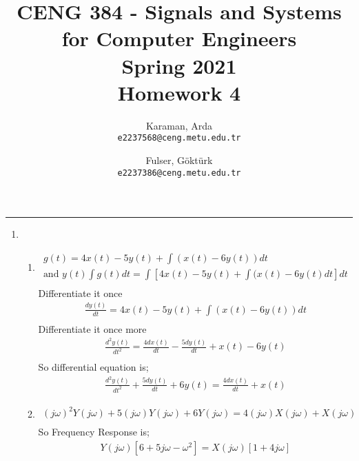 \documentclass[10pt,a4paper, margin=1in]{article}
\author{
  Karaman, Arda\\
  \texttt{e2237568@ceng.metu.edu.tr}
  \and
  Fulser, Göktürk\\
  \texttt{e2237386@ceng.metu.edu.tr}
}
\title{CENG 384 - Signals and Systems for Computer Engineers \\
Spring 2021 \\
Homework 4}
\begin{document}
\maketitle



\noindent\rule{19cm}{1.2pt}

\begin{enumerate}

\item %
    \begin{enumerate}
    \item %
    \begin{align*}
        g(t) = 4x(t) - 5y(t) + \int(x(t)-6y(t))dt\\
        \text{and } y(t) \int g(t)dt = \int[4x(t) - 5y(t) + \int(x(t)-6y(t)dt]dt\\
    \end{align*}
Differentiate it once
    \begin{align*}
        \frac{dy(t)}{dt} = 4x(t) - 5y(t) + \int(x(t)-6y(t))dt\\
    \end{align*}
Differentiate it once more
    \begin{align*}
        \frac{d^2y(t)}{dt^2} = \frac{4dx(t)}{dt} - \frac{5dy(t)}{dt} + x(t)-6y(t)\\
    \end{align*}
So differential equation is;
    \begin{align*}
        \frac{d^2y(t)}{dt^2} + \frac{5dy(t)}{dt} +6y(t) = \frac{4dx(t)}{dt} + x(t)
    \end{align*}
    
    
    
    
    \item %
    \begin{align*}
        (j\omega)^2 Y(j\omega) + 5 (j\omega) Y(j\omega) + 6Y(j\omega) = 4(j\omega)X(j\omega) + X(j\omega)\\
    \end{align*}
So Frequency Response is;
    \begin{align*}
        Y(j\omega)[ 6 + 5j\omega - \omega^2 ] = X(j\omega)[ 1+ 4j\omega ]
    \end{align*}
    
    
    
    
    

\end{enumerate}
\end{enumerate}
\end{document}
